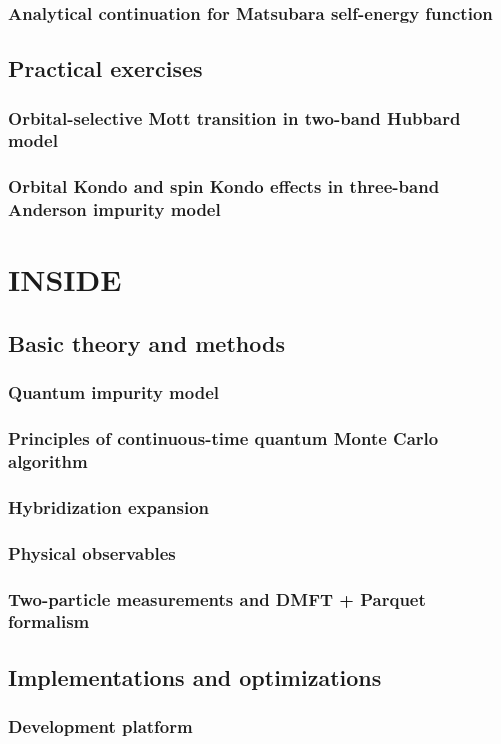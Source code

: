 \documentclass[10pt]{book}
\begin{document}
\subsection{Analytical continuation for Matsubara self-energy function}
\section{Practical exercises}
\subsection{Orbital-selective Mott transition in two-band Hubbard model}
\subsection{Orbital Kondo and spin Kondo effects in three-band Anderson impurity model}

\chapter{INSIDE {\iqist}}
\section{Basic theory and methods}
\subsection{Quantum impurity model}
\subsection{Principles of continuous-time quantum Monte Carlo algorithm}
\subsection{Hybridization expansion}
\subsection{Physical observables}
\subsection{Two-particle measurements and DMFT + Parquet formalism}
\section{Implementations and optimizations}
\subsection{Development platform}
\end{document}
